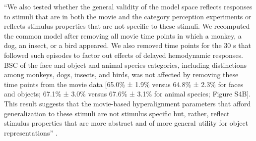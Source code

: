 %
``We also tested whether the general validity of the model space reflects
responses to stimuli that are in both the movie and the category perception
experiments or reflects stimulus properties that are not specific to these
stimuli.
%
We recomputed the common model after removing all movie time points in which a
monkey, a dog, an insect, or a bird appeared. We also removed time points for
the 30 s that followed such episodes to factor out effects of delayed
hemodynamic responses.
%
BSC of the face and object and animal species categories, including distinctions
among monkeys, dogs, insects, and birds, was not affected by removing these time
points from the movie data [65.0\% ± 1.9\% versus 64.8\% ± 2.3\% for faces and
objects; 67.1\% ± 3.0\% versus 67.6\% ± 3.1\% for animal species; Figure S4B].
%
This result suggests that the movie-based hyperalignment parameters that afford
generalization to these stimuli are not stimulus specific but, rather, reflect
stimulus properties that are more abstract and of more general utility for
object representations'' \citep{haxby2011common}.
